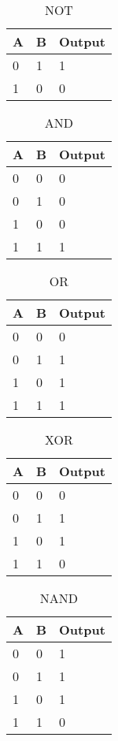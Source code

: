 \documentclass[12pt, letterpaper, titlepage]{article}
\begin{document}
\begin{table}[h]
\centering\caption{NOT}
\begin{tabular}{|l|l|l|}
\hline
A & B & Output\\
\hline
0 & 1 & 1\\
\hline
1 & 0 & 0\\
\hline
\end{tabular}
\end{table}
\begin{table}[h]
\centering\caption{AND}
\begin{tabular}{|l|l|l|}
\hline
A & B & Output\\
\hline
0 & 0 & 0\\
\hline
0 & 1 & 0\\
\hline
1 & 0 & 0\\
\hline
1 & 1 & 1\\
\hline
\end{tabular}
\end{table}
\begin{table}[h]
\centering\caption{OR}
\begin{tabular}{|l|l|l|}
\hline
A & B & Output\\
\hline
0 & 0 & 0\\
\hline
0 & 1 & 1\\
\hline
1 & 0 & 1\\
\hline
1 & 1 & 1\\
\hline
\end{tabular}
\end{table}
\begin{table}[h]
\centering\caption{XOR}
\begin{tabular}{|l|l|l|}
\hline
A & B & Output\\
\hline
0 & 0 & 0\\
\hline
0 & 1 & 1\\
\hline
1 & 0 & 1\\
\hline
1 & 1 & 0\\
\hline
\end{tabular}
\end{table}
\begin{table}[h]
\centering\caption{NAND}
\begin{tabular}{|l|l|l|}
\hline
A & B & Output\\
\hline
0 & 0 & 1\\
\hline
0 & 1 & 1\\
\hline
1 & 0 & 1\\
\hline
1 & 1 & 0\\
\hline
\end{tabular}
\end{table}
\end{document}
